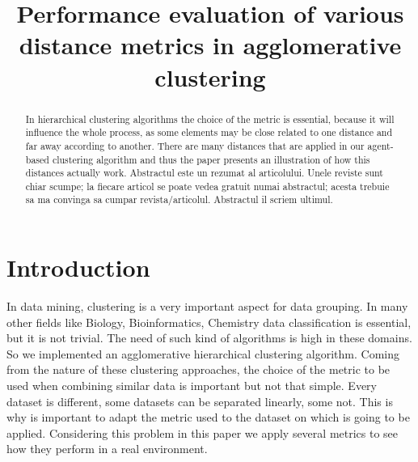 \documentclass[conference]{IEEEtran}
\begin{document}
\title{Performance evaluation of various distance metrics in agglomerative clustering}

\author{
}

\maketitle


\begin{abstract}

In hierarchical clustering algorithms the choice of the metric is essential, because it will influence the whole process, as some elements may be close related to one distance and far away according to another. There are many distances that are applied in our agent-based clustering algorithm and thus the paper presents an illustration of how this distances actually work.
{\color{red} Abstractul este un rezumat al articolului. Unele reviste sunt chiar scumpe; la fiecare articol se poate vedea gratuit numai abstractul; acesta trebuie sa ma convinga sa cumpar revista/articolul. Abstractul il scriem ultimul.
}

\end{abstract}


\section{Introduction}

In data mining, clustering is a very important aspect for data grouping. In many other fields like Biology\cite{biology}, Bioinformatics\cite{website:bioinformatics}, Chemistry\cite{website:chemistry} data classification is essential, but it is not trivial. The need of such kind of algorithms is high in these domains. So we implemented an agglomerative hierarchical clustering algorithm. Coming from the nature of these clustering approaches, the choice of the metric to be used when combining similar data is important but not that simple. Every dataset is different, some datasets can be separated linearly, some not\cite{website:iris}. This is why is important to adapt the metric used to the dataset on which is going to be applied. Considering this problem in this paper we apply several metrics to see how they perform in a real environment.
\end{document}
